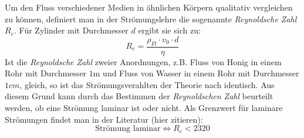Um den Fluss verschiedener Medien in ähnlichen Körpern qualitativ vergleichen zu können, definiert man in der Strömungslehre die sogenannte \emph{Reynoldsche Zahl} $R_e$. Für
Zylinder mit Durchmesser $d$ ergibt sie sich zu:
\begin{equation}
  R_e = \frac{\rho_{Fl} \cdot v_0 \cdot d}{\eta}
  \label{eq: reynolds}
\end{equation}
Ist die \emph{Reynoldsche Zahl} zweier Anordnungen, z.B. Fluss von Honig in einem Rohr mit Durchmesser $1 \si{\meter}$ und Fluss von Wasser in einem Rohr mit Durchmesser $1\si{cm}$, gleich, so
ist das Strömungsverahlten der Theorie nach identisch. Aus diesem Grund kann durch das Bestimmen der \emph{Reynoldschen Zahl} beurteilt werden, ob eine Strömung laminar ist oder nicht.
Als Grenzwert für laminare Strömungen findet man in der Literatur (hier zitieren):
\begin{equation}
  \text{Strömung laminar} \Leftrightarrow R_e < 2320
  \label{eq: laminar}
\end{equation}
